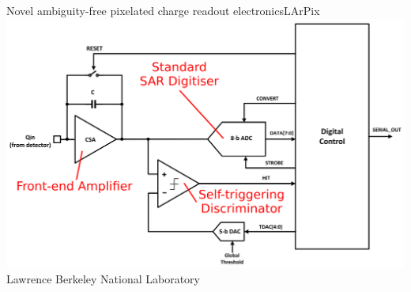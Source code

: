 \documentclass[]{beamer}
\newcommand*{\larpix}{{LArPix}}
\begin{document}
\begin{frame}{Novel ambiguity-free pixelated charge readout electronics}{\larpix{}}
	\centering
	\includegraphics[height=.75\textheight]{larpix/schematic}\\
	{\tiny Lawrence Berkeley National Laboratory}
\end{frame}
\end{document}
